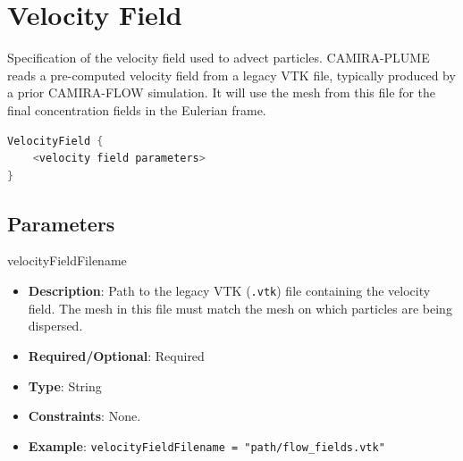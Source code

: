 \section{Velocity Field}

Specification of the velocity field used to advect particles. CAMIRA-PLUME reads a pre-computed velocity field from a legacy VTK file, typically produced by a prior CAMIRA-FLOW simulation. It will use the mesh from this file for the final concentration fields in the Eulerian frame.

\begin{lstlisting}[language=C++]
VelocityField {
    <velocity field parameters>
}
\end{lstlisting}

\subsection*{Parameters}

velocityFieldFilename
\vspace{\the\parameterListSpacing}
\begin{itemize}
    \item {\bf Description}: Path to the legacy VTK (\lstinline!.vtk!) file containing the velocity field. The mesh in this file must match the mesh on which particles are being dispersed.
    \item {\bf Required/Optional}: Required
    \item {\bf Type}: String
    \item {\bf Constraints}: None.
    \item {\bf Example}: \lstinline!velocityFieldFilename = "path/flow_fields.vtk"!
\end{itemize}
